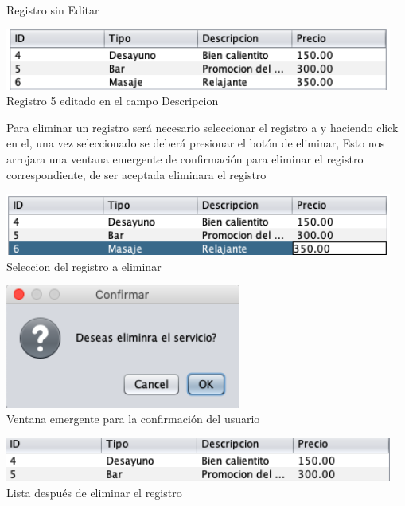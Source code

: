 \documentclass[12pt]{article}
\begin{document}
\begin{flushleft}
\begin{center}
\textsf{\\Registro sin Editar}
\end{center}
\vspace{0.5cm}
\begin{center}
\includegraphics[width=12.75cm]{12.png}
\textsf{\\Registro 5 editado en el campo Descripcion}
\end{center}
\textsf{Para eliminar un registro será necesario seleccionar el registro a  y haciendo click en el, una vez seleccionado se deberá presionar el botón de eliminar, Esto nos arrojara una ventana emergente de confirmación para eliminar el registro correspondiente, de ser aceptada eliminara el registro}
\vspace{0.5cm}
\begin{center}
\includegraphics[width=12.75cm]{13.png}
\textsf{\\Seleccion del registro a eliminar}
\end{center}
\vspace{0.5cm}
\begin{center}
\includegraphics[width=7.75cm]{14.png}
\textsf{\\Ventana emergente para la confirmación del usuario}
\end{center}
\vspace{0.5cm}
\begin{center}
\includegraphics[width=12.75cm]{15.png}
\textsf{\\Lista después de eliminar el registro}
\end{center}





\end{flushleft}
\end{document}
